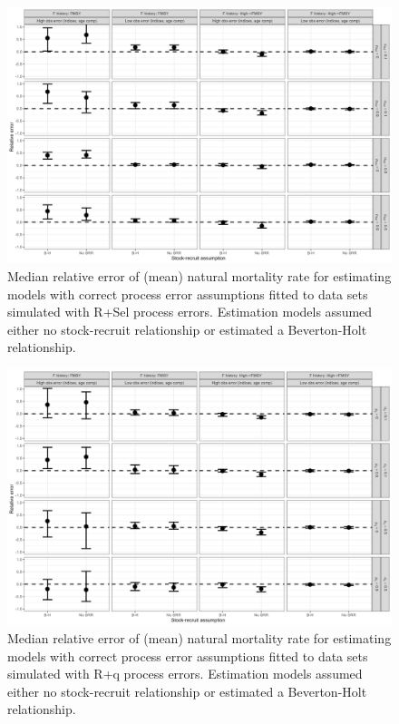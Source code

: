 \documentclass[
  12pt,
]{article}
\begin{document}
\begin{landscape}
\begin{figure}
\caption{Median relative error of (mean) natural mortality rate for estimating models with correct process error assumptions fitted to data sets simulated with R+Sel process errors. Estimation models assumed either no stock-recruit relationship or estimated a Beverton-Holt relationship.}\label{Sel_om_M_relbias}
\begin{center}
\includegraphics[width = \textwidth]{Sel_om_M_relerror.png}
\end{center}
\end{figure}
\end{landscape}

\begin{landscape}
\begin{figure}
\caption{Median relative error of (mean) natural mortality rate for estimating models with correct process error assumptions fitted to data sets simulated with R+q process errors. Estimation models assumed either no stock-recruit relationship or estimated a Beverton-Holt relationship.}\label{q_om_M_relbias}
\begin{center}
\includegraphics[width = \textwidth]{q_om_M_relerror.png}
\end{center}
\end{figure}
\end{landscape}
\end{document}
